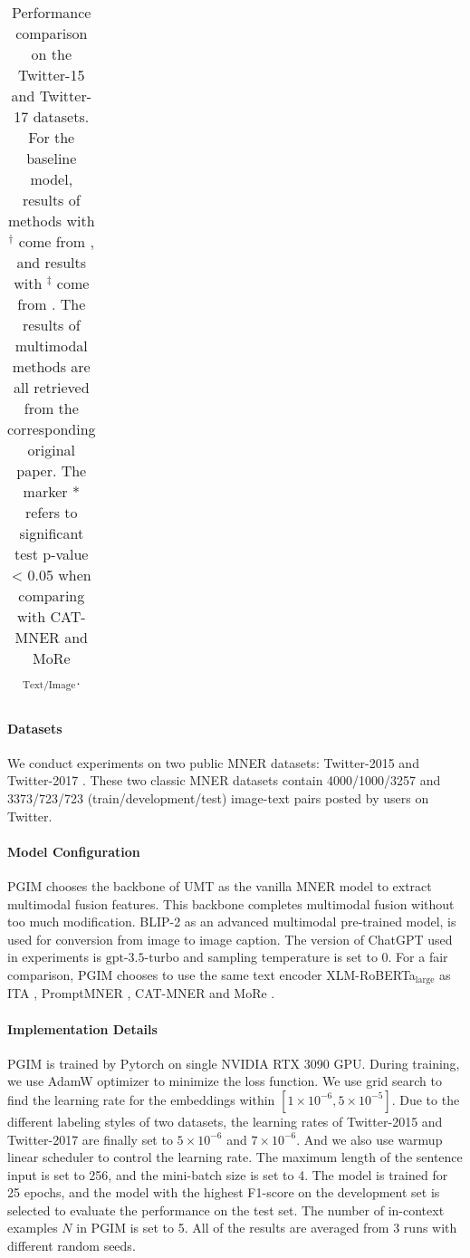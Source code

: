 \documentclass[11pt]{article}
\begin{document}
\begin{table*}[!]
\begin{tabular}{lcccccccccccccc}
\bottomrule
\end{tabular}
\caption{Performance comparison on the Twitter-15 and Twitter-17 datasets. For the baseline model, results of methods with $^\dag$ come from 
\citet{yu2020improving}, and results with $^\ddag$ come from  \citet{wang2022cat}. The results of multimodal methods are all retrieved from the corresponding original paper. The marker * refers to significant test p-value < 0.05 when comparing with CAT-MNER and MoRe${_{\text{Text/Image}}}$.}
\label{tab:maintabel}
\end{table*}

\paragraph{Datasets}
We conduct experiments on two public MNER datasets: Twitter-2015 \citep{zhang2018adaptive} and Twitter-2017 \citep{lu2018visual}.
These two classic MNER datasets contain 4000/1000/3257 and 3373/723/723 (train/development/test) image-text pairs posted by users on Twitter.

\paragraph{Model Configuration}
PGIM chooses the backbone of UMT \citep{yu2020improving} as the vanilla MNER model to extract multimodal fusion features. This backbone completes multimodal fusion without too much modification. 
BLIP-2 \citep{li2023blip} as an advanced multimodal pre-trained model, is used for conversion from image to image caption. 
The version of ChatGPT used in experiments is $\text{gpt-3.5-turbo}$ and sampling temperature is set to 0. 
For a fair comparison, PGIM chooses to use the same text encoder XLM-RoBERTa$_\text{large}$ \citep{conneau2019unsupervised} as ITA \citep{wang2021ita}, PromptMNER \citep{wang2022promptmner}, CAT-MNER \citep{wang2022cat} and MoRe \citep{wang2022named}.


\paragraph{Implementation Details}
PGIM is trained by Pytorch on single NVIDIA RTX 3090 GPU. During training, we use AdamW \citep{loshchilov2017decoupled} optimizer to minimize the loss function. We use grid search to find the learning rate for the embeddings within $[1\times 10^{-6}, 5\times 10^{-5}]$. 
Due to the different labeling styles of two datasets, the learning rates of Twitter-2015 and Twitter-2017 are finally set to $5\times 10^{-6}$ and $7\times 10^{-6}$. 
And we also use warmup linear scheduler to control the learning rate. 
The maximum length of the sentence input is set to 256, and the mini-batch size is set to 4. 
The model is trained for 25 epochs, and the model with the highest F1-score on the development set is selected to evaluate the performance on the test set. The number of in-context examples $N$ in PGIM is set to 5. All of the results are averaged from 3 runs with different random seeds.
\end{document}
